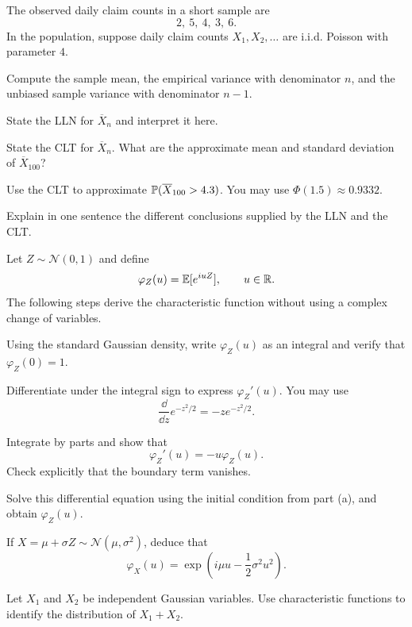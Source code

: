 \begin{exercise}
The observed daily claim counts in a short sample are
\[
2,\ 5,\ 4,\ 3,\ 6.
\]
In the population, suppose daily claim counts $X_1,X_2,\ldots$ are i.i.d.
Poisson with parameter $4$.
\begin{exparts}
  \item Compute the sample mean, the empirical variance with denominator $n$,
  and the unbiased sample variance with denominator $n-1$.
  \item State the LLN for $\overline X_n$ and interpret it here.
  \item State the CLT for $\overline X_n$. What are the approximate mean and
  standard deviation of $\overline X_{100}$?
  \item Use the CLT to approximate
  $\mathbb P(\overline X_{100}>4.3)$. You may use $\Phi(1.5)\approx0.9332$.
  \item Explain in one sentence the different conclusions supplied by the LLN
  and the CLT.
\end{exparts}
\end{exercise}

\begin{exercise}
Let $Z\sim\mathcal N(0,1)$ and define
\[
\varphi_Z(u)=\mathbb E[e^{iuZ}],\qquad u\in\mathbb{R}.
\]
The following steps derive the characteristic function without using a
complex change of variables.
\begin{exparts}
  \item Using the standard Gaussian density, write $\varphi_Z(u)$ as an
  integral and verify that $\varphi_Z(0)=1$.
  \item Differentiate under the integral sign to express
  $\varphi_Z'(u)$. You may use
  \[
  \frac{\dd}{\dd z}e^{-z^2/2}=-z e^{-z^2/2}.
  \]
  \item Integrate by parts and show that
  \[
  \varphi_Z'(u)=-u\varphi_Z(u).
  \]
  Check explicitly that the boundary term vanishes.
  \item Solve this differential equation using the initial condition from
  part (a), and obtain $\varphi_Z(u)$.
  \item If $X=\mu+\sigma Z\sim\mathcal N(\mu,\sigma^2)$, deduce that
  \[
  \varphi_X(u)=\exp\!\left(i\mu u-\frac12\sigma^2u^2\right).
  \]
  \item Let $X_1$ and $X_2$ be independent Gaussian variables. Use
  characteristic functions to identify the distribution of $X_1+X_2$.
\end{exparts}
\end{exercise}

